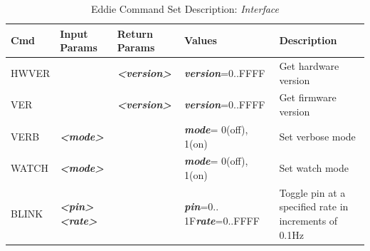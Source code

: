 \begin{table}[H]
\caption{Eddie Command Set Description: \textit{Interface}}
\label{tab:eddie_commands}
\begin{tabular}{|p{4em}|p{6em}|p{6em}|p{9em}|p{11em}|}
\hline
\textbf{\large Cmd} & \textbf{\large Input Params} & \textbf{\large Return Params} & \textbf{\large Values} & \textbf{\large Description} \\ \hline \hline
HWVER &  & \textit{\textbf{<version>}} & \textit{\textbf{version}}=0..FFFF & Get hardware version \\ \hline
VER &  & \textit{\textbf{<version>}} & \textit{\textbf{version}}=0..FFFF & Get firmware version \\ \hline
VERB & \textit{\textbf{<mode>}} &  & \textit{\textbf{mode}}= 0(off), 1(on) & Set verbose mode \\ \hline
WATCH & \textit{\textbf{<mode>}} &  & \textit{\textbf{mode}}= 0(off), 1(on) & Set watch mode \\ \hline
BLINK & \textit{\textbf{<pin>}}\textit{\textbf{<rate>}} &  & \textit{\textbf{pin}}=0.. 1F\newline\textit{\textbf{rate}}=0..FFFF & Toggle pin at a specified rate in increments of 0.1Hz \\ \hline
\end{tabular}
\end{table}

